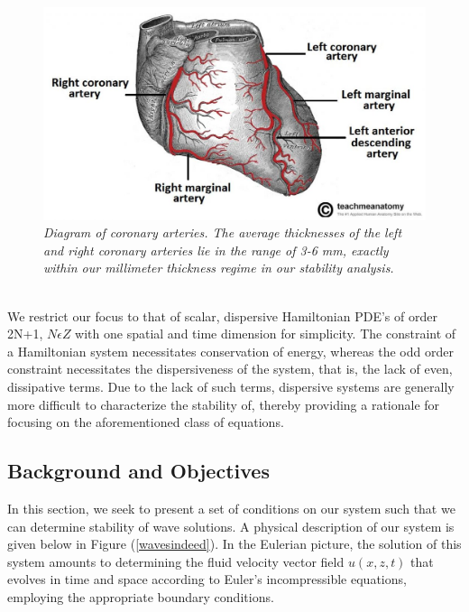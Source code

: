 \documentclass{article}
\begin{document}
 \begin{figure}[hbt!]
\centering
\includegraphics[scale = .45]{bloodvessel.jpg}
\caption{ \emph{Diagram of coronary arteries. The average thicknesses of the left and right coronary arteries lie in the range of 3-6 mm, exactly within our millimeter thickness regime in our stability analysis. }}  \label{bloodvessel}
\end{figure}
 
 \\


 
 We restrict our focus to that of scalar, dispersive Hamiltonian PDE’s of order 2N+1, \(N \epsilon Z\) with one spatial and time dimension for simplicity. The constraint of a Hamiltonian system necessitates conservation of energy, whereas the odd order constraint necessitates the dispersiveness of the system, that is, the lack of even, dissipative terms. Due to the lack of such terms, dispersive systems are generally more difficult to characterize the stability of, thereby providing a rationale for focusing on the aforementioned class of equations. \\
 
 \clearpage
 
 \subsection{Background and Objectives}
 
  In this section, we seek to present a set of conditions on our system such that we can determine stability of wave solutions. A physical description of our system is given below in Figure (\ref{wavesindeed}). In the Eulerian picture, the solution of this system amounts to determining the fluid velocity vector field \(u(x,z,t)\) that evolves in time and space according to Euler's incompressible equations, employing the appropriate boundary conditions. 
  
\end{document}
